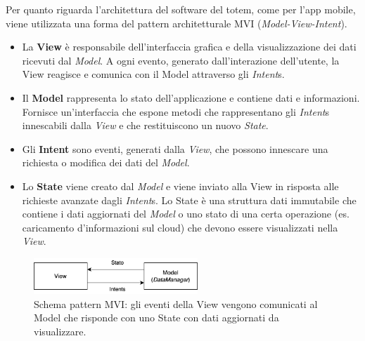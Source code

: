 Per quanto riguarda l'architettura del software del totem, come per l'app mobile, viene utilizzata una forma del pattern architetturale MVI (\textit{Model-View-Intent}).
\begin{itemize}
    \item La \textbf{View} è responsabile dell'interfaccia grafica e della visualizzazione dei dati ricevuti dal \textit{Model}. A ogni evento, generato dall'interazione dell'utente, la View reagisce e comunica con il Model attraverso gli \textit{Intent}s.
    \item Il \textbf{Model} rappresenta lo stato dell'applicazione e contiene dati e informazioni. Fornisce un'interfaccia che espone metodi che rappresentano gli \textit{Intent}s innescabili dalla \textit{View} e che restituiscono un nuovo \textit{State}.
    \item Gli \textbf{Intent} sono eventi, generati dalla \textit{View}, che possono innescare una richiesta o modifica dei dati del \textit{Model}.
    \item Lo \textbf{State} viene creato dal \textit{Model} e viene inviato alla View in risposta alle richieste avanzate dagli \textit{Intent}s. Lo State è una struttura dati immutabile che contiene i dati aggiornati del \textit{Model} o uno stato di una certa operazione (es. caricamento d'informazioni sul cloud) che devono essere visualizzati nella \textit{View}.
\end{itemize}
\begin{figure}[h!]
    \centering
    \includegraphics[width=0.55\textwidth]{img/totem/mvi-schema.png}
    \caption[Schema pattern MVI]{Schema pattern MVI: gli eventi della View vengono comunicati al Model che risponde con uno State con dati aggiornati da visualizzare.}
    \label{fig:mviPattern}
\end{figure}


